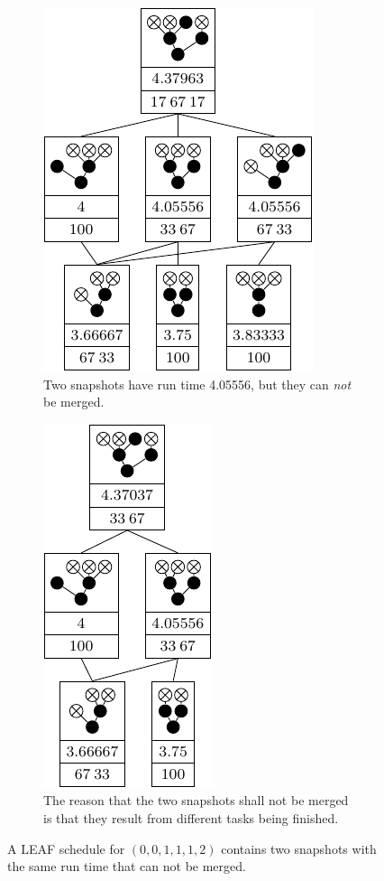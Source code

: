 \begin{figure}[th]
  \centering
  \begin{subfigure}{.45\textwidth}
    \centering{}
    \includegraphics{p3/001112_leaf.pdf}
    \caption{Two snapshots have run time 4.05556, but they can \emph{not} be merged.}
  \label{fig:p3-001112-two-snaps-same-run-time-not-mergeable-original}
  \end{subfigure}
  \quad
  \begin{subfigure}{.45\textwidth}
    \centering{}
    \includegraphics{p3/001112_leaf_opt.pdf}
    \caption{The reason that the two snapshots shall not be merged is that they result from different tasks being finished.}
  \label{fig:p3-001112-two-snaps-same-run-time-not-mergeable-optimal}
  \end{subfigure}
  \caption{A LEAF schedule for $(0,0,1,1,1,2)$ contains two snapshots with the same run time that can not be merged.}
  \label{fig:p3-001112-two-snaps-same-run-time-not-mergeable}
\end{figure}

